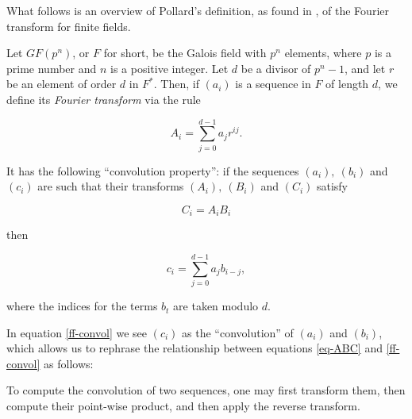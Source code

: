
What follows is an overview of Pollard's definition, as found in \cite{pollard-fftFiniteFields-1971}, of the Fourier transform for finite fields.

\bigskip

Let $GF(p^n)$, or $F$ for short, be the Galois field with $p^n$ elements, where $p$ is a prime number and $n$ is a positive integer. Let $d$ be a divisor of $p^n - 1$, and let $r$ be an element of order $d$ in $F^*$. Then, if $(a_i)$ is a sequence in $F$ of length $d$, we define its \emph{Fourier transform} via the rule

\begin{equation}\label{ft-ff}
	A_i = \sum_{j=0}^{d-1} a_j r^{ij}.
\end{equation}

It has the following ``convolution property'': if the sequences $(a_i), \ (b_i)$ and $(c_i)$ are such that their transforms $(A_i), \ (B_i)$ and $(C_i)$ satisfy

\begin{equation}\label{eq-ABC}
	C_i = A_i B_i
\end{equation}

then

\begin{equation}\label{ff-convol}
	c_i = \sum_{j=0}^{d-1} a_j b_{i-j},
\end{equation}

where the indices for the terms $b_t$ are taken modulo $d$.

\bigskip

In equation \eqref{ff-convol} we see $(c_i)$ as the ``convolution'' of $(a_i)$ and $(b_i)$, which allows us to rephrase the relationship between equations \eqref{eq-ABC} and \eqref{ff-convol} as follows:

\begin{lem}
	To compute the convolution of two sequences, one may first transform them, then compute their point-wise product, and then apply the reverse transform.
\end{lem}
